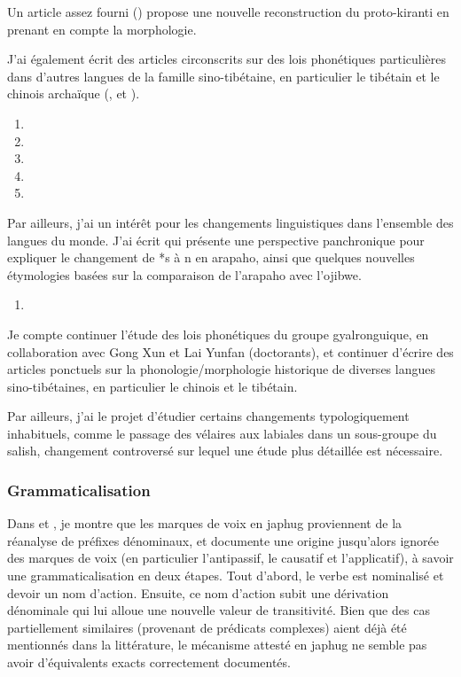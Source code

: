 \documentclass[oldfontcommands,oneside,a4paper,11pt]{article}
\begin{document}
Un article assez fourni (\citealt{jacques17pkiranti}) propose une nouvelle reconstruction du proto-kiranti en prenant en compte la morphologie.

J'ai également écrit des articles circonscrits sur des lois phonétiques particulières dans d'autres langues de la famille sino-tibétaine, en particulier le tibétain et le chinois archaïque (\citealt{jacques15sr}, \citealt{jacques14snom} et \citealt{jacques13yod}).

\begin{enumerate}
 \item {}
 \item {}
 \item {}
 \item {}
 \item {}
\end{enumerate}

Par ailleurs, j'ai un intérêt pour les changements linguistiques dans l'ensemble des langues du monde. J'ai écrit \citet{jacques13arapaho} qui présente une perspective panchronique pour expliquer le changement de *s à n en arapaho, ainsi que quelques nouvelles étymologies basées sur la comparaison de l'arapaho avec l'ojibwe.

\begin{enumerate}
 \item {}
\end{enumerate}

Je compte continuer l'étude des lois phonétiques du groupe gyalronguique, en collaboration avec Gong Xun et Lai Yunfan (doctorants), et continuer d'écrire des articles ponctuels sur la phonologie/morphologie historique de diverses langues sino-tibétaines, en particulier le chinois et le tibétain.

Par ailleurs, j'ai le projet d'étudier certains changements typologiquement inhabituels, comme le passage des vélaires aux labiales dans un sous-groupe du salish, changement controversé sur lequel une étude plus détaillée est nécessaire.
         
\subsubsection{Grammaticalisation}
Dans \citet{jacques14antipassive} et \citet{jacques15causative}, je montre que les marques de voix en japhug proviennent de la réanalyse de préfixes dénominaux, et documente une origine jusqu'alors ignorée des marques de voix (en particulier l'antipassif, le causatif et l'applicatif), à savoir une grammaticalisation en deux étapes. Tout d'abord, le verbe est nominalisé et devoir un nom d'action. Ensuite, ce nom d'action subit une dérivation dénominale qui lui alloue une nouvelle valeur de transitivité. Bien que des cas partiellement similaires (provenant de prédicats complexes) aient déjà été mentionnés dans la littérature, le mécanisme attesté en japhug ne semble pas avoir d'équivalents exacts correctement documentés.
\end{document}
